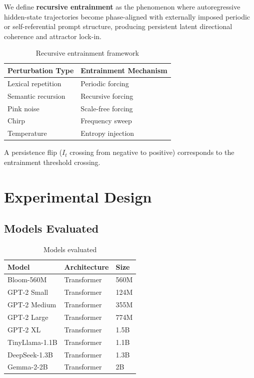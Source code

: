 \documentclass{article}
\begin{document}
We define \textbf{recursive entrainment} as the phenomenon where autoregressive hidden-state trajectories become phase-aligned with externally imposed periodic or self-referential prompt structure, producing persistent latent directional coherence and attractor lock-in.

\begin{table}[H]
\centering
\caption{Recursive entrainment framework}
\label{tab:entrainment}
\begin{tabular}{ll}
\toprule
Perturbation Type & Entrainment Mechanism \\
\midrule
Lexical repetition & Periodic forcing \\
Semantic recursion & Recursive forcing \\
Pink noise & Scale-free forcing \\
Chirp & Frequency sweep \\
Temperature & Entropy injection \\
\bottomrule
\end{tabular}
\end{table}

A persistence flip ($I_t$ crossing from negative to positive) corresponds to the entrainment threshold crossing.

\section{Experimental Design}

\subsection{Models Evaluated}

\begin{table}[H]
\centering
\caption{Models evaluated}
\label{tab:models}
\begin{tabular}{lll}
\toprule
Model & Architecture & Size \\
\midrule
Bloom-560M & Transformer & 560M \\
GPT-2 Small & Transformer & 124M \\
GPT-2 Medium & Transformer & 355M \\
GPT-2 Large & Transformer & 774M \\
GPT-2 XL & Transformer & 1.5B \\
TinyLlama-1.1B & Transformer & 1.1B \\
DeepSeek-1.3B & Transformer & 1.3B \\
Gemma-2-2B & Transformer & 2B \\
\bottomrule
\end{tabular}
\end{table}
\end{document}
